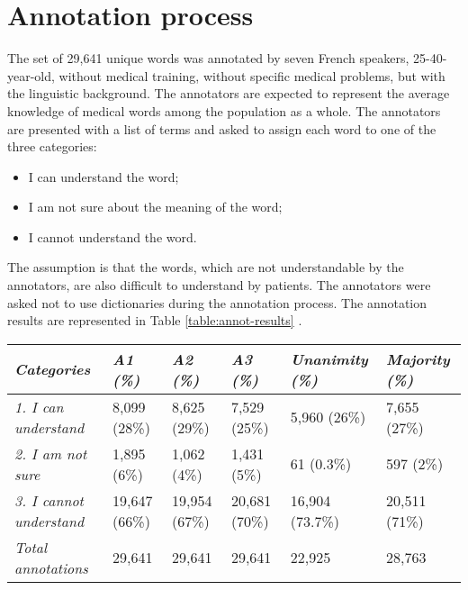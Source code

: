 \section{Annotation process}

The set of 29,641 unique words was annotated by seven French speakers, 25-40-year-old, without medical training, without specific medical problems, but with the linguistic background. The annotators are expected to represent the average knowledge of medical words among the population as a whole. The annotators are presented with a list of terms and asked to assign each word to one of the three categories:

\begin{itemize}
    \item  I can understand the word;
    \item  I am not sure about the meaning of the word;
    \item  I cannot understand the word.
\end{itemize}
The assumption is that the words, which are not understandable by the annotators, are also difficult to understand by patients. The annotators were asked not to use dictionaries during the annotation process. The annotation results are represented in Table \ref{table:annot-results} .

\begin{table*}[h]
\begin{tabular}{l|lllll}
\hline
\textit{Categories}             & \textit{A1 (\%)} & \textit{A2 (\%)} & \textit{A3 (\%)} & \textit{Unanimity (\%)} & \textit{Majority (\%)} \\ \hline
\textit{1. I can understand}    & 8,099 (28\%)     & 8,625 (29\%)     & 7,529 (25\%)     & 5,960 (26\%)            & 7,655 (27\%)           \\
\textit{2. I am not sure}       & 1,895 (6\%)      & 1,062 (4\%)      & 1,431 (5\%)      & 61 (0.3\%)              & 597 (2\%)              \\
\textit{3. I cannot understand} & 19,647 (66\%)    & 19,954 (67\%)    & 20,681 (70\%)    & 16,904 (73.7\%)         & 20,511 (71\%)          \\ \hline
\textit{Total annotations}      & 29,641           & 29,641           & 29,641           & 22,925                  & 28,763                 \\ \hline
\end{tabular}
\caption{Number (and percentage) of words assigned to reference categories by three annotators (A1, A2
and A3), and in the derived datasets unanimity and majority.}
\label{table:annot-results}
\end{table*}

